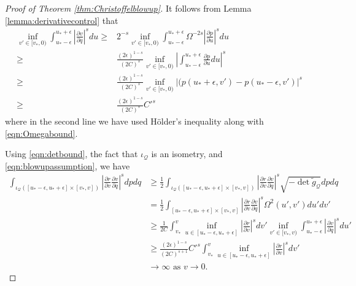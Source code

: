 \documentclass{article}
\newcommand{\Q}{\mathcal{Q}}
\begin{document}
\begin{proof}[Proof of Theorem \ref{thm:Christoffelblowup}]
It follows from Lemma \ref{lemma:derivativecontrol} that
\begin{equation} \label{EqContrC1}
    \begin{split}
        \inf_{v'\in[v_*,0)}\int_{u_*-\epsilon}^{u_*+\epsilon} \left|\frac{\partial v}{\partial q}\right|^{s} du\geq& 2^{-s}\inf_{v'\in[v_*,0)}\int_{u_*-\epsilon}^{u_*+\epsilon}\Omega^{-2s} \left|\frac{\partial p}{\partial u}\right|^{s} du\\
        \geq& \frac{(2\epsilon)^{1-s}}{(2C)^{s} }\inf_{v'\in[v_*,0)}\left|\int_{u_*-\epsilon}^{u_*+\epsilon} \frac{\partial p}{\partial u}du\right|^{s}\\
        \geq& \frac{(2\epsilon)^{1-s}}{(2C)^{s} }\inf_{v'\in[v_*,0)}\left|(p(u_*+\epsilon,v')-p(u_*-\epsilon,v')\right|^{s}\\
        \geq& \frac{(2\epsilon)^{1-s}}{(2C)^{s} }C'^{s}
    \end{split}
\end{equation}
where in the second line we have used H\"{o}lder's inequality along with \eqref{eqn:Omegabound}.

Using \eqref{eqn:detbound}, the fact that $\iota_\Q$ is an isometry, and \eqref{eqn:blowupassumption}, we have
\begin{align}
        \int_{\iota_{\Q}([u_*-\epsilon,u_*+\epsilon]\times[v_*,v])}\left|\frac{\partial r}{\partial v}\frac{\partial v}{\partial q}\right|^{s} dpdq&\geq \frac{1}{2}\int_{\iota_{\Q}([u_*-\epsilon,u_*+\epsilon]\times[v_*,v])}\left|\frac{\partial r}{\partial v}\frac{\partial v}{\partial q}\right|^{s} \sqrt{-\det \tilde{g}_{\Q}}dpdq\\
        &= \frac{1}{2}\int_{[u_*-\epsilon,u_*+\epsilon]\times[v_*,v]}\left|\frac{\partial r}{\partial v}\frac{\partial v}{\partial q}\right|^{s} \Omega^2(u',v')du'dv'\\
        &\geq \frac{1}{2C}\int_{v_*}^v \inf_{u\in[u_*-\epsilon,u_*+\epsilon]}\left|\frac{\partial r}{\partial v}\right|^{s} dv' \inf_{v'\in[v_*,v)}\int_{u_*-\epsilon}^{u_*+\epsilon} \left|\frac{\partial v}{\partial q}\right|^{s} du'\\
        &\geq \frac{(2\epsilon)^{1-s}}{(2C)^{s+1} }C'^{s} \int_{v_*}^v \inf_{u\in[u_*-\epsilon,u_*+\epsilon]}\left|\frac{\partial r}{\partial v}\right|^{s} dv' \\
        &\to\infty\text{ as }v\to 0.\label{eqn:divergence}
\end{align}


\end{proof}
\end{document}
